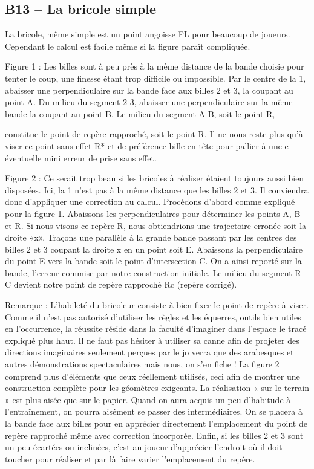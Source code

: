 \subsection{B13 -- La bricole simple}\label{b13-la-bricole-simple}

La bricole, même simple est un point angoisse FL pour beaucoup de
joueurs. Cependant le calcul est facile même si la figure paraît
compliquée.

Figure 1 : Les billes sont à peu près à la même distance de la bande
choisie pour tenter le coup, une finesse étant trop difficile ou
impossible. Par le centre de la 1, abaisser une perpendiculaire sur la
bande face aux billes 2 et 3, la coupant au point A. Du milieu du
segment 2-3, abaisser une perpendiculaire sur la même bande la coupant
au point B. Le milieu du segment A-B, soit le point R, -

constitue le point de repère rapproché, soit le point R. Il ne nous
reste plus qu'à viser ce point sans effet R* et de préférence bille
en-tête pour pallier à une e éventuelle mini erreur de prise sans effet.

Figure 2 : Ce serait trop beau si les bricoles à réaliser étaient
toujours aussi bien disposées. Ici, la 1 n'est pas à la même distance
que les billes 2 et 3. Il conviendra donc d'appliquer une correction au
calcul. Procédons d'abord comme expliqué pour la figure 1. Abaissons les
perpendiculaires pour déterminer les points A, B et R. Si nous visons ce
repère R, nous obtiendrions une trajectoire erronée soit la droite «x».
Traçons une parallèle à la grande bande passant par les centres des
billes 2 et 3 coupant la droite x en un point soit E. Abaissons la
perpendiculaire du point E vers la bande soit le point d'intersection C.
On a ainsi reporté sur la bande, l'erreur commise par notre construction
initiale. Le milieu du segment R-C devient notre point de repère
rapproché Rc (repère corrigé).

Remarque : L'habileté du bricoleur consiste à bien fixer le point de
repère à viser. Comme il n'est pas autorisé d'utiliser les règles et les
équerres, outils bien utiles en l'occurrence, la réussite réside dans la
faculté d'imaginer dans l'espace le tracé expliqué plus haut. Il ne faut
pas hésiter à utiliser sa canne afin de projeter des directions
imaginaires seulement perçues par le jo verra que des arabesques et
autres démonstrations spectaculaires mais nous, on s'en fiche ! La
figure 2 comprend plus d'éléments que ceux réellement utilisés, ceci
afin de montrer une construction complète pour les géomètres exigeants.
La réalisation « sur le terrain » est plus aisée que sur le papier.
Quand on aura acquis un peu d'habitude à l'entraînement, on pourra
aisément se passer des intermédiaires. On se placera à la bande face aux
billes pour en apprécier directement l'emplacement du point de repère
rapproché même avec correction incorporée. Enfin, si les billes 2 et 3
sont un peu écartées ou inclinées, c'est au joueur d'apprécier l'endroit
où il doit toucher pour réaliser et par là faire varier l'emplacement du
repère.


